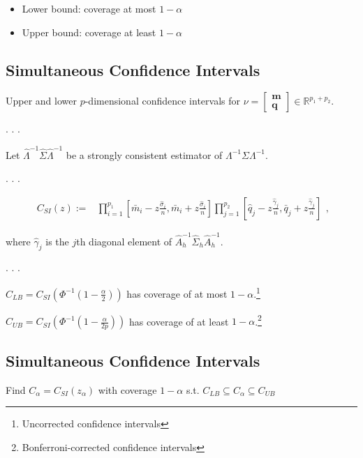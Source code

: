 \documentclass[
  letterpaper,
  DIV=11,
  numbers=noendperiod]{scrartcl}
\begin{document}
\begin{itemize}
\item
  Lower bound: coverage at most \(1-\alpha\)
\item
  Upper bound: coverage at least \(1-\alpha\)
\end{itemize}

\hypertarget{simultaneous-confidence-intervals-1}{%
\subsection{Simultaneous Confidence
Intervals}\label{simultaneous-confidence-intervals-1}}

Upper and lower \(p\)-dimensional confidence intervals for
\(\nu = \begin{bmatrix}\mathbf m \\ \mathbf q \end{bmatrix} \in \mathbb{R}^{p_1 + p_2}\).

. . .

Let \(\hat\Lambda^{-1}\hat\Sigma\hat\Lambda^{-1}\) be a strongly
consistent estimator of \(\Lambda^{-1}\Sigma\Lambda^{-1}\).

. . .

\[\begin{align}
C_{SI}(z) :=& \prod_{i=1}^{p_1}\left[\bar m_{i} - z\frac{\hat\sigma_i}{n}, \bar m_{i} + z\frac{\hat\sigma_i}{n}\right]\prod_{j=1}^{p_2}\left[\hat q_{j} - z\frac{\hat\gamma_{j}}{n}, \bar q _{j} + z\frac{\hat\gamma_{j}}{n}\right]
\end{align},\]

where \(\hat\gamma_j\) is the \(j\)th diagonal element of
\(\hat A_h^{-1}\hat\Sigma_h\hat A_h^{-1}\).

. . .

\(C_{LB} = C_{SI}\left(\Phi^{-1}\left(1-\frac\alpha 2\right)\right)\)
has coverage of at most \(1-\alpha\).\footnote{Uncorrected confidence
  intervals}

\(C_{UB} = C_{SI}\left(\Phi^{-1}\left(1-\frac\alpha {2p}\right)\right)\)
has coverage of at least \(1-\alpha\).\footnote{Bonferroni-corrected
  confidence intervals}

\hypertarget{simultaneous-confidence-intervals-2}{%
\subsection{Simultaneous Confidence
Intervals}\label{simultaneous-confidence-intervals-2}}

Find \(C_{\alpha} = C_{SI}(z_\alpha)\) with coverage \(1 - \alpha\) s.t.
\(C_{LB}\subseteq C_{\alpha} \subseteq C_{UB}\)
\end{document}
